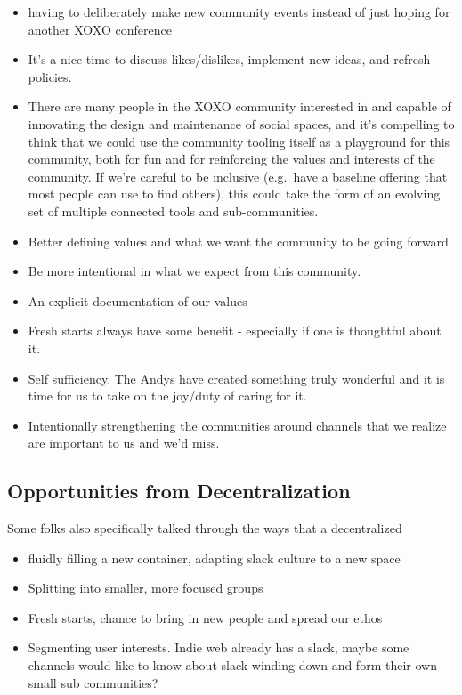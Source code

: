 \documentclass[
]{book}
\providecommand{\tightlist}{%
  \setlength{\itemsep}{0pt}\setlength{\parskip}{0pt}}
\begin{document}
\begin{itemize}
\tightlist
\item
  having to deliberately make new community events instead of just hoping for another XOXO conference
\item
  It's a nice time to discuss likes/dislikes, implement new ideas, and refresh policies.
\item
  There are many people in the XOXO community interested in and capable of innovating the design and maintenance of social spaces, and it's compelling to think that we could use the community tooling itself as a playground for this community, both for fun and for reinforcing the values and interests of the community. If we're careful to be inclusive (e.g.~have a baseline offering that most people can use to find others), this could take the form of an evolving set of multiple connected tools and sub-communities.
\item
  Better defining values and what we want the community to be going forward
\item
  Be more intentional in what we expect from this community.
\item
  An explicit documentation of our values
\item
  Fresh starts always have some benefit - especially if one is thoughtful about it.
\item
  Self sufficiency. The Andys have created something truly wonderful and it is time for us to take on the joy/duty of caring for it.
\item
  Intentionally strengthening the communities around channels that we realize are important to us and we'd miss.
\end{itemize}

\subsection{Opportunities from Decentralization}\label{opportunities-from-decentralization}

Some folks also specifically talked through the ways that a decentralized

\begin{itemize}
\tightlist
\item
  fluidly filling a new container, adapting slack culture to a new space
\item
  Splitting into smaller, more focused groups
\item
  Fresh starts, chance to bring in new people and spread our ethos
\item
  Segmenting user interests. Indie web already has a slack, maybe some channels would like to know about slack winding down and form their own small sub communities?
\end{itemize}
\end{document}
